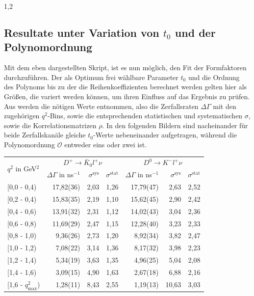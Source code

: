 \documentclass[11pt,a4paper,twoside,draft]{report}
\begin{document}
\begin{spacing}{1,2}
\subsection{Resultate unter Variation von $t_0$ und der Polynomordnung}
Mit dem eben dargestellten Skript, ist es nun möglich, den Fit der Formfaktoren durchzuführen. Der als Optimum frei wählbare Parameter $t_0$ und die 
Ordnung des Polynoms bis zu der die Reihenkoeffizienten berechnet werden gelten hier als Größen, die variert werden können, um ihren Einfluss auf das
Ergebnis zu prüfen. Aus \cite{PhysRev_Data} werden die nötigen Werte entnommen, also die Zerfallsraten $\Delta \Gamma$ mit den zugehörigen $q^2$-Bins,
sowie die entsprechenden statistischen und systematischen $\sigma$, sowie die Korrelationsmatrizen $\rho$. In den folgenden Bildern sind 
nacheinander für beide Zerfallskanäle gleiche $t_0$-Werte nebeneinander aufgetragen, während die Polynomordnung $\mathcal{O}$ entweder eins oder zwei ist.
 \renewcommand{\arraystretch}{1.2}
 \begin{table}[h]
   \begin{tabular}{l|rrr|rrr}
   \toprule
     \multirow{2}{*}{$q^2$ in GeV$^2$}& \multicolumn{3}{c|}{$D^+ \rightarrow \bar K_0 l^+ \nu$} & \multicolumn{3}{c}{$D^0 \rightarrow  K^- l^+ \nu$}\\
     \cline{2-7}
     & $\Delta \Gamma$ in ns$^{-1}$ & $\sigma^\text{sys}$ & $\sigma^\text{stat}$ & $\Delta \Gamma$ in ns$^{-1}$ & $\sigma^\text{sys}$ & $\sigma^\text{stat}$\\
    \midrule
   {[}0,0 - 0,4) & 	17,82(36)&	2,03&	1,26&	17,79(47)&	2,63&	2,52 \\
   {[}0,2 - 0,4)& 	15,83(35)&	2,19&	1,10&	15,62(45)&	2,90&	2,42\\
   {[}0,4 - 0,6) &	13,91(32)&	2,31&	1,12&	14,02(43)&	3,04&	2,36\\
   {[}0,6 - 0,8) & 	11,69(29)&	2,47&	1,15&	12,28(40)&	3,23&	2,33\\
   {[}0,8 - 1,0)  &	9,36(26)&	2,73&	1,20&	8,92(34)&	3,82&	2,47\\
   {[}1,0 - 1,2)  &	7,08(22)&	3,14&	1,36&	8,17(32)&	3,98&	2,23\\
   {[}1,2 - 1,4)  &	5,34(19)&	3,63&	1,35&	4,96(25)&	5,04&	2,08\\
   {[}1,4 - 1,6)  &	3,09(15)&	4,90&	1,63&	2,67(18)&	6,88&	2,16\\
   {[}1,6 - $q^2_\text{max}$)&	1,28(11)&	8,43&	2,55&	1,19(13)&	10,63&	3,03\\
   \bottomrule\bottomrule
   \end{tabular}

\end{table}
\end{spacing}
\end{document}
